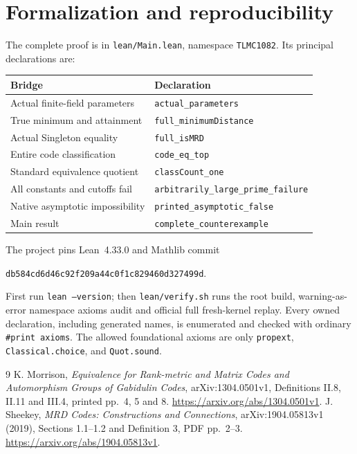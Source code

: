 \documentclass[10pt,a4paper]{article}
\begin{document}
\section*{Formalization and reproducibility}
The complete proof is in \texttt{lean/Main.lean}, namespace
\texttt{TLMC1082}. Its principal declarations are:
\begin{center}
\begin{tabular}{ll}
\toprule
Bridge & Declaration\\
\midrule
Actual finite-field parameters & \texttt{actual\_parameters}\\
True minimum and attainment & \texttt{full\_minimumDistance}\\
Actual Singleton equality & \texttt{full\_isMRD}\\
Entire code classification & \texttt{code\_eq\_top}\\
Standard equivalence quotient & \texttt{classCount\_one}\\
All constants and cutoffs fail & \texttt{arbitrarily\_large\_prime\_failure}\\
Native asymptotic impossibility & \texttt{printed\_asymptotic\_false}\\
Main result & \texttt{complete\_counterexample}\\
\bottomrule
\end{tabular}
\end{center}
The project pins Lean~4.33.0 and Mathlib commit\par
\texttt{db584cd6d46c92f209a44c0f1c829460d327499d}.\par
First run \texttt{lean --version}; then \texttt{lean/verify.sh} runs the
root build, warning-as-error namespace axioms audit and official full
fresh-kernel replay. Every owned declaration, including generated names,
is enumerated and checked with ordinary \texttt{\#print axioms}.
The allowed foundational axioms are only \texttt{propext},
\texttt{Classical.choice}, and \texttt{Quot.sound}.

\begin{thebibliography}{9}
K. Morrison, \emph{Equivalence for Rank-metric and Matrix Codes and
Automorphism Groups of Gabidulin Codes}, arXiv:1304.0501v1,
Definitions II.8, II.11 and III.4, printed pp.~4, 5 and 8.
\url{https://arxiv.org/abs/1304.0501v1}.
J. Sheekey, \emph{MRD Codes: Constructions and Connections},
arXiv:1904.05813v1 (2019), Sections 1.1--1.2 and Definition 3,
PDF pp.~2--3. \url{https://arxiv.org/abs/1904.05813v1}.
\end{thebibliography}
\end{document}
